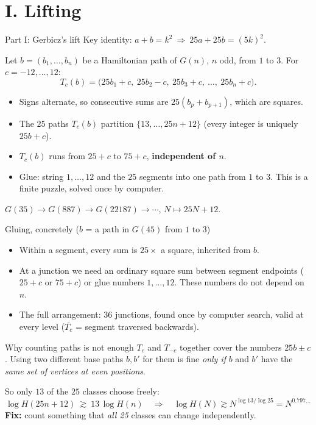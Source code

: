 \documentclass[11pt,aspectratio=169]{beamer}
\newcommand{\Ham}{H}
\begin{document}
\section{I. Lifting}
\begin{frame}{Part I: Gerbicz's lift}
Key identity: \quad $a+b=k^2 \ \Longrightarrow\ 25a+25b=(5k)^2.$

\medskip
Let $b=(b_1,\dots,b_n)$ be a Hamiltonian path of $G(n)$, $n$ odd, from $1$ to $3$.
For $c=-12,\dots,12$:
\[
T_c(b)=\bigl(25b_1+c,\ 25b_2-c,\ 25b_3+c,\ \dots,\ 25b_n+c\bigr).
\]
\begin{itemize}
\item Signs alternate, so consecutive sums are $25(b_p+b_{p+1})$, which are squares.
\item The $25$ paths $T_c(b)$ partition $\{13,\dots,25n+12\}$ (every integer is uniquely $25b+c$).
\item $T_c(b)$ runs from $25+c$ to $75+c$, \textbf{independent of $n$}.
\item Glue: string $1,\dots,12$ and the $25$ segments into one path from $1$ to $3$.
 This is a finite puzzle, solved once by computer.
\end{itemize}
\smallskip
\begin{center}
$G(35)\to G(887)\to G(22187)\to\cdots$, \quad $N\mapsto 25N+12$.
\end{center}
\end{frame}

\begin{frame}{Gluing, concretely ($b$ = a path in $G(45)$ from $1$ to $3$)}
\centering
\resizebox{\linewidth}{!}{}

\medskip
\raggedright\small
\begin{itemize}
\item Within a segment, every sum is $25\times$ a square, inherited from $b$.
\item At a junction we need an ordinary square sum between segment endpoints
 ($25+c$ or $75+c$) or glue numbers $1,\dots,12$. These numbers do not depend on $n$.
\item The full arrangement: $36$ junctions, found once by computer search, valid at every level
 ($\overline{T_c}$ = segment traversed backwards).
\end{itemize}
\end{frame}

\begin{frame}{Why counting paths is not enough}
$T_c$ and $T_{-c}$ together cover the numbers $25b\pm c$. Using two different base paths
$b,b'$ for them is fine \emph{only if} $b$ and $b'$ have the \emph{same set of vertices at
even positions}.

\medskip
So only $13$ of the $25$ classes choose freely:
\[
\log\Ham(25n+12)\ \gtrsim\ 13\,\log\Ham(n)
\quad\Longrightarrow\quad
\log\Ham(N)\gtrsim N^{\log 13/\log 25}=N^{0.797\ldots}
\]
\pause
\textbf{Fix:} count something that \emph{all 25} classes can change independently.
\end{frame}
\end{document}
